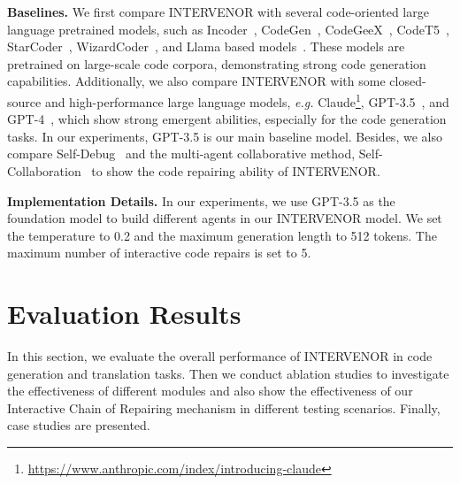 \documentclass[11pt]{article}
\begin{document}
\textbf{Baselines.} We first compare INTERVENOR with several code-oriented large language pretrained models, such as Incoder~\cite{fried2022incoder}, CodeGen~\cite{nijkamp2022codegen}, CodeGeeX~\cite{zheng2023codegeex}, CodeT5~\cite{wang2023codet5+}, StarCoder~\cite{li2023starcoder}, WizardCoder~\cite{luo2023wizardcoder}, and Llama based models~\cite{touvron2023llama,roziere2023code}. These models are pretrained on large-scale code corpora, demonstrating strong code generation capabilities. Additionally, we also compare INTERVENOR with some closed-source and high-performance large language models, \textit{e.g.} Claude\footnote{\url{https://www.anthropic.com/index/introducing-claude}}, GPT-3.5~\cite{chatgpt}, and GPT-4~\cite{openai2023gpt4}, which show strong emergent abilities, especially for the code generation tasks. In our experiments, GPT-3.5 is our main baseline model. Besides, we also compare Self-Debug~\cite{chen2023teaching} and the multi-agent collaborative method, Self-Collaboration~\cite{dong2023selfcollaboration} to show the code repairing ability of INTERVENOR.


\textbf{Implementation Details.} In our experiments, we use GPT-3.5 as the foundation model to build different agents in our INTERVENOR model. We set the temperature to 0.2 and the maximum generation length to 512 tokens. The maximum number of interactive code repairs is set to 5.



 






\section{Evaluation Results}
In this section, we evaluate the overall performance of INTERVENOR in code generation and translation tasks. Then we conduct ablation studies to investigate the effectiveness of different modules and also show the effectiveness of our Interactive Chain of Repairing mechanism in different testing scenarios. Finally, case studies are presented.
\end{document}
